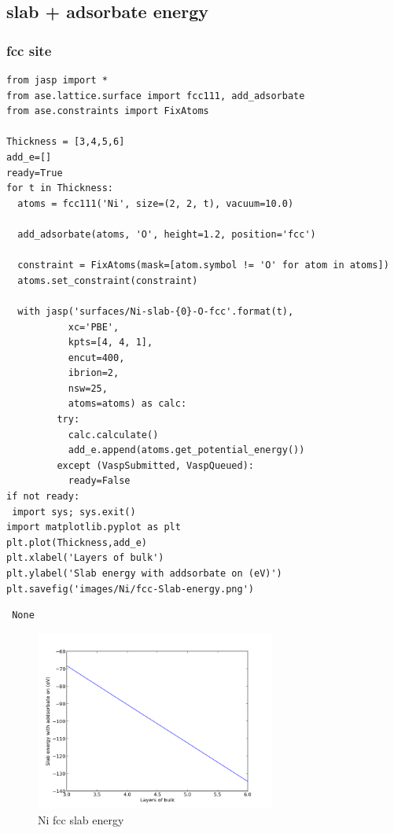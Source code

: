 \documentclass[11pt]{article}
\begin{document}
\subsection{slab + adsorbate energy}
\label{sec-3-4}
\subsubsection{fcc site}
\label{sec-3-4-1}


\begin{verbatim}
from jasp import *
from ase.lattice.surface import fcc111, add_adsorbate
from ase.constraints import FixAtoms

Thickness = [3,4,5,6]
add_e=[]
ready=True
for t in Thickness:
  atoms = fcc111('Ni', size=(2, 2, t), vacuum=10.0)

  add_adsorbate(atoms, 'O', height=1.2, position='fcc')

  constraint = FixAtoms(mask=[atom.symbol != 'O' for atom in atoms])
  atoms.set_constraint(constraint)

  with jasp('surfaces/Ni-slab-{0}-O-fcc'.format(t),
           xc='PBE',
           kpts=[4, 4, 1],
           encut=400,
           ibrion=2,
           nsw=25,
           atoms=atoms) as calc:
         try:
           calc.calculate()
           add_e.append(atoms.get_potential_energy())
         except (VaspSubmitted, VaspQueued):
           ready=False
if not ready:
 import sys; sys.exit()
import matplotlib.pyplot as plt
plt.plot(Thickness,add_e)
plt.xlabel('Layers of bulk')
plt.ylabel('Slab energy with addsorbate on (eV)')
plt.savefig('images/Ni/fcc-Slab-energy.png')
\end{verbatim}

\begin{verbatim}
 None
\end{verbatim}
\begin{figure}[H]
\centering
\includegraphics[width=0.7\textwidth]{./images/Ni/fcc-Slab-energy.png}
\caption{Ni fcc slab energy}
\end{figure}
\end{document}
